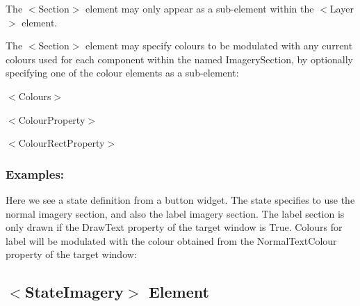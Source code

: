 \begin{DoxyItemize}
\item The {\ttfamily $<$Section$>$} element may only appear as a sub-\/element within the {\ttfamily $<$Layer$>$} element.


\item The {\ttfamily $<$Section$>$} element may specify colours to be modulated with any current colours used for each component within the named Imagery\+Section, by optionally specifying one of the colour elements as a sub-\/element\+: 
\begin{DoxyItemize}
\item {\ttfamily $<$Colours$>$} 
\item {\ttfamily $<$Colour\+Property$>$} 
\item {\ttfamily $<$Colour\+Rect\+Property$>$} 
\end{DoxyItemize}
\end{DoxyItemize}\hypertarget{fal_element_ref_fal_elem_ref_sec_29_4}{}\subsubsection{Examples\+:}\label{fal_element_ref_fal_elem_ref_sec_29_4}
Here we see a state definition from a button widget. The state specifies to use the \textquotesingle{}normal\textquotesingle{} imagery section, and also the \textquotesingle{}label\textquotesingle{} imagery section. The \textquotesingle{}label\textquotesingle{} section is only drawn if the \textquotesingle{}Draw\+Text\textquotesingle{} property of the target window is \textquotesingle{}True\textquotesingle{}. Colours for \textquotesingle{}label\textquotesingle{} will be modulated with the colour obtained from the \textquotesingle{}Normal\+Text\+Colour\textquotesingle{} property of the target window\+: 
\begin{DoxyCode}{0}
\end{DoxyCode}
\hypertarget{fal_element_ref_fal_elem_ref_sec_30}{}\subsection{$<$\+State\+Imagery$>$ Element}\label{fal_element_ref_fal_elem_ref_sec_30}
